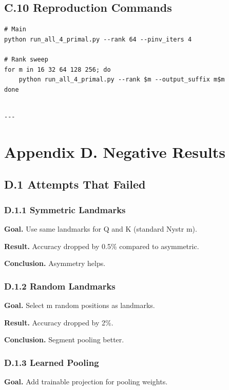 \subsection{C.10 Reproduction Commands}

\begin{lstlisting}
# Main
python run_all_4_primal.py --rank 64 --pinv_iters 4

# Rank sweep
for m in 16 32 64 128 256; do
    python run_all_4_primal.py --rank $m --output_suffix m$m
done
\end{lstlisting}
\begin{lstlisting}

---
\end{lstlisting}


\section{Appendix D. Negative Results}

\subsection{D.1 Attempts That Failed}

\subsubsection{D.1.1 Symmetric Landmarks}

\textbf{Goal.} Use same landmarks for Q and K (standard Nystr m).

\textbf{Result.} Accuracy dropped by 0.5\% compared to asymmetric.

\textbf{Conclusion.} Asymmetry helps.

\subsubsection{D.1.2 Random Landmarks}

\textbf{Goal.} Select m random positions as landmarks.

\textbf{Result.} Accuracy dropped by 2\%.

\textbf{Conclusion.} Segment pooling better.

\subsubsection{D.1.3 Learned Pooling}

\textbf{Goal.} Add trainable projection for pooling weights.

